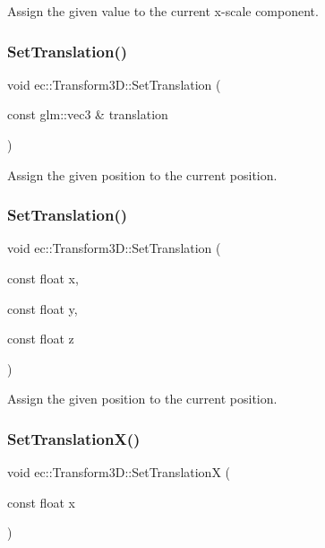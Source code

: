 Assign the given value to the current x-\/scale component. \mbox{\label{classec_1_1_transform3_d_a3a2ebde1bdb7b79e080deaee7555e251}} 
\subsubsection{\texorpdfstring{Set\+Translation()}{SetTranslation()}\hspace{0.1cm}{\footnotesize\ttfamily [1/2]}}
{\footnotesize\ttfamily void ec\+::\+Transform3\+D\+::\+Set\+Translation (\begin{DoxyParamCaption}\item[{const glm\+::vec3 \&}]{translation }\end{DoxyParamCaption})}

Assign the given position to the current position. \mbox{\label{classec_1_1_transform3_d_a14c627a2eea894334e652ba9046bdcae}} 
\subsubsection{\texorpdfstring{Set\+Translation()}{SetTranslation()}\hspace{0.1cm}{\footnotesize\ttfamily [2/2]}}
{\footnotesize\ttfamily void ec\+::\+Transform3\+D\+::\+Set\+Translation (\begin{DoxyParamCaption}\item[{const float}]{x,  }\item[{const float}]{y,  }\item[{const float}]{z }\end{DoxyParamCaption})}

Assign the given position to the current position. \mbox{\label{classec_1_1_transform3_d_a150e25babd8e2aeeb650c768e4d5d448}} 
\subsubsection{\texorpdfstring{Set\+Translation\+X()}{SetTranslationX()}}
{\footnotesize\ttfamily void ec\+::\+Transform3\+D\+::\+Set\+TranslationX (\begin{DoxyParamCaption}\item[{const float}]{x }\end{DoxyParamCaption})}

